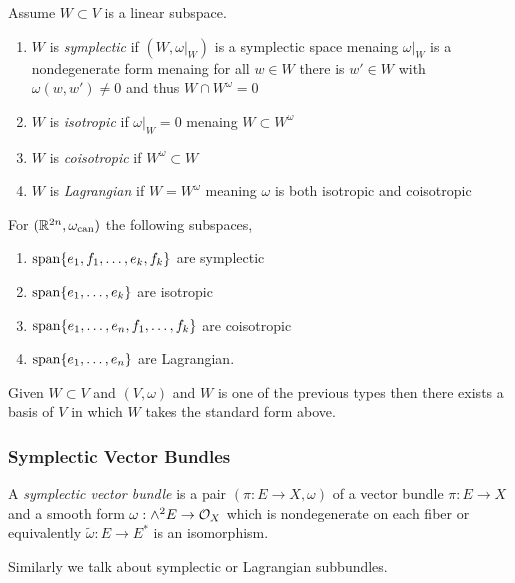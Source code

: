 \documentclass[12pt]{article}
\begin{document}
\begin{defn}
Assume $W \subset V$ is a linear subspace. 
\begin{enumerate}
\item $W$ is \textit{symplectic} if $(W, \omega|_W)$ is a symplectic space menaing $\omega|_W$ is a nondegenerate form menaing for all $w \in W$ there is $w' \in W$ with $\omega(w, w') \neq 0$ and thus $W \cap W^\omega = 0$
\item $W$ is \textit{isotropic} if $\omega|_W = 0$ menaing $W \subset W^\omega$
\item $W$ is \textit{coisotropic} if $W^\omega \subset W$
\item $W$ is \textit{Lagrangian} if $W = W^\omega$ meaning $\omega$ is both isotropic and coisotropic 
\end{enumerate}
\end{defn}

\begin{example}
For $(\mathbb{R}^{2n}, \omega_{\text{can}})$ the following subspaces,
\begin{enumerate}
\item $\mathrm{span}\! \left\{e_1, f_1, \dots, e_k, f_k \right\}$ are symplectic
\item $\mathrm{span}\! \left\{e_1, \dots, e_k \right\}$ are isotropic
\item $\mathrm{span}\! \left\{e_1, \dots, e_n, f_1, \dots, f_k \right\}$ are coisotropic
\item $\mathrm{span}\! \left\{e_1, \dots, e_n \right\}$ are Lagrangian. 
\end{enumerate}
\end{example}

\begin{prop}
Given $W \subset V$ and $(V, \omega)$ and $W$ is one of the previous types then there exists a basis of $V$ in which $W$ takes the standard form above. 
\end{prop}

\subsubsection{Symplectic Vector Bundles}

\begin{defn}
A \textit{symplectic vector bundle} is a pair $(\pi : E \to X, \omega)$ of a vector bundle $\pi : E \to X$ and a smooth form $\omega : \wedge^2 E \to \mathcal{O}_{X}$ which is nondegenerate on each fiber or equivalently $\tilde{\omega} : E \to E^*$ is an isomorphism. 
\end{defn}

\begin{rmk}
Similarly we talk about symplectic or Lagrangian subbundles.
\end{rmk}
\end{document}
